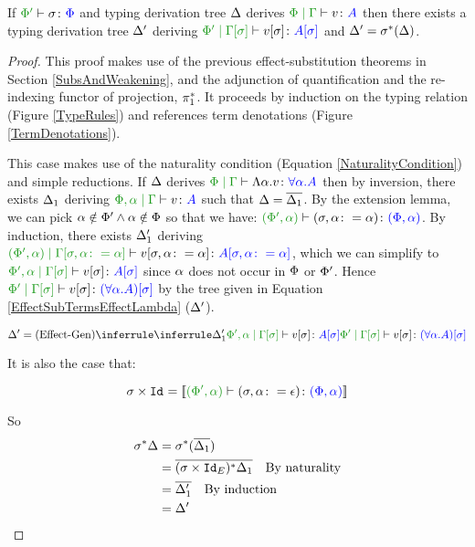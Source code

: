 \begin{framed}
    \begin{theorem}\label{EffectSubstitutionOnTerms}
        If $\typerelation{\P'}{\si}{\P}$ and typing derivation tree $\D$ derives $\gpetyperelation{v}{A}$ then there exists a typing derivation tree  $\D'$ deriving $\etyperelation{\P'}{\G\ssi}{v\ssi}{A\ssi}$ and $\D' = \si\star(\D)$.
    \end{theorem}
    
    
    \begin{proof}
        This proof makes use of the previous effect-substitution theorems in Section \ref{SubsAndWeakening}, and the adjunction of quantification and the re-indexing functor of projection, $\pstar$. It proceeds by induction on the typing relation (Figure \ref{TypeRules}) and references term denotations (Figure \ref{TermDenotations}).
    
        \case{\vgen}
    
    This case makes use of the naturality condition (Equation \ref{NaturalityCondition}) and simple reductions. 
    If $\D$ derives $\gpetyperelation{\elam{\a}{v}}{\all{\a}{A}}$ then by inversion, there exists $\D_1$ deriving  $\etyperelation{\P,\a}{\G}{v}{A}$ such that $\D = \bar{\D_1}$. By the extension lemma, we can pick $\a\notin\P'\wedge\a\notin\P$ so that we have: $\typerelation{(\P',\a)}{(\si, \a\setto\a)}{(\P,\a)}$. By induction, there exists $\D_1'$ deriving $\etyperelation{(\P', \a)}{\G\sub{\si, \a\setto\a}}{v\sub{\si,\a\setto\a}}{A\sub{\si, \a\setto\a}}$, which we can simplify to $\etyperelation{\P',\a}{\G\ssi}{v\ssi}{A\ssi}$ since $\a$ does not occur in $\P$ or $\P'$. Hence $\etyperelation{\P'}{\G\ssi}{v\ssi}{(\all{\a}{A})\ssi}$ by the tree given in Equation \ref{EffectSubTermsEffectLambda} ($\D'$).
    
    \begin{equation}\label{EffectSubTermsEffectLambda}
        \D' = \ntreeruleI{\vgen}{\treeruleI{\D_1'}{\etyperelation{\P',\a}{\G\ssi}{v\ssi}{A\ssi}}}{\etyperelation{\P'}{\G\ssi}{v\ssi}{(\all{\a}{A})\ssi}}
    \end{equation}
    
    It is also the case that:
    
    \begin{equation}
        \si\times\Id{} = \deno{\typerelation{(\P',\a)}{(\si, \a\setto\e)}{(\P,\a)}}
    \end{equation}
    
    So
    \begin{align*}
        \si\star\D &= \si\star(\bar{\D_1})\\
        & = \bar{(\si\times\Id{E})\star\D_1}\qt{By naturality}\\
        & = \bar{\D_1'}\qt{By induction}\\
        & = \D'
    \end{align*}
    

\end{proof}
\end{framed}
